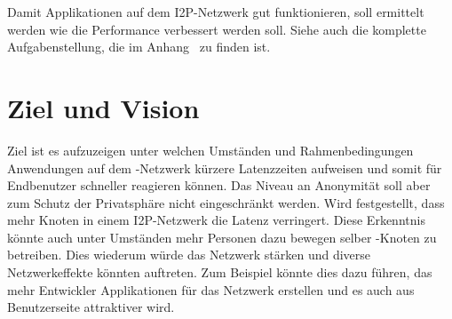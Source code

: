 Damit Applikationen auf dem I2P-Netzwerk gut funktionieren, soll ermittelt werden wie die Performance
verbessert werden soll.
Siehe auch die komplette Aufgabenstellung, die im Anhang~ zu finden ist.


\section{Ziel und Vision}\label{sec:ziel}

Ziel ist es aufzuzeigen unter welchen Umständen und Rahmenbedingungen Anwendungen auf dem -Netzwerk kürzere Latenzzeiten aufweisen
und somit für Endbenutzer schneller reagieren können. Das Niveau an Anonymität soll aber zum Schutz der Privatsphäre nicht eingeschränkt werden.
Wird festgestellt, dass mehr Knoten in einem I2P-Netzwerk die Latenz verringert.
Diese Erkenntnis könnte auch unter Umständen mehr Personen dazu bewegen selber -Knoten zu betreiben.
Dies wiederum würde das Netzwerk stärken und diverse Netzwerkeffekte könnten auftreten.
Zum Beispiel könnte dies dazu führen, das mehr Entwickler Applikationen für das Netzwerk erstellen und es auch aus Benutzerseite attraktiver wird.


